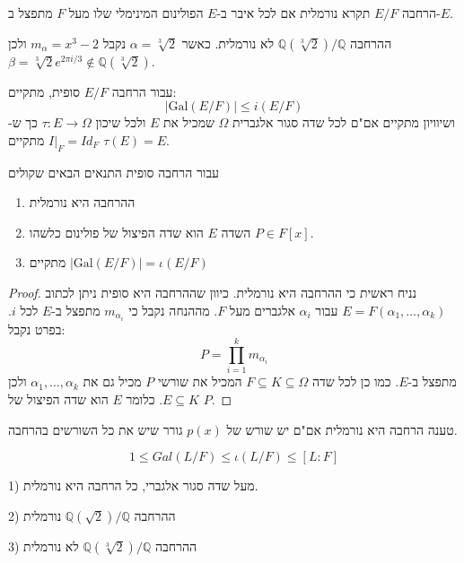 \documentclass{tstextbook}
\begin{document}
\begin{definition}
הרחבה \(E / F\) תקרא נורמלית אם לכל איבר ב-\(E\) הפולינום המינימלי שלו מעל \(F\) מתפצל ב-\(E\).

\end{definition}
\begin{example}
ההרחבה \(\mathbb{Q}\left( \sqrt[3]{ 2 }  \right) / \mathbb{Q}\)  לא נורמלית. כאשר  \(\alpha = \sqrt[3]{ 2 }\) נקבל \(m_{\alpha}=x^3 - 2\)   ולכן \(\beta = \sqrt[3]{ 2 }e^{2\pi i/3} \not\in \mathbb{Q}\left( \sqrt[3]{ 2 } \right)\).

\end{example}
\begin{proposition}
עבור הרחבה \(E / F\) סופית, מתקיים:
$$\left\lvert  \mathrm{Gal}( E / F)  \right\rvert \leq i (E / F)$$
ושיוויון מתקיים אם"ם לכל שדה סגור אלגברית \(\Omega\) שמכיל את \(E\) ולכל שיכון \(\tau:E \to \Omega\) כך ש-\(I|_{F}=Id_{F}\) מתקיים \(\tau(E)=E\).

\end{proposition}
\begin{proposition}
עבור הרחבה סופית התנאים הבאים שקולים

  \begin{enumerate}
    \item ההרחבה היא נורמלית 


    \item השדה \(E\) הוא שדה הפיצול של פולינום כלשהו \(P \in F[x]\). 


    \item מתקיים \(\left\lvert  \mathrm{Gal}(E / F)  \right\rvert=\iota(E / F)\)


  \end{enumerate}
\end{proposition}
\begin{proof}
נניח ראשית כי ההרחבה היא נורמלית. כיוון שההרחבה היא סופית ניתן לכתוב \(E=F\left( \alpha_{1},\dots,\alpha_{k} \right)\) עבור \(\alpha_{i}\) אלגברים מעל \(F\). מההנחה נקבל כי \(m_{\alpha_{i}}\) מתפצל ב-\(E\) לכל \(i\). בפרט נקבל:
$$P=\prod_{i=1}^{k}m_{\alpha_{i}}$$
מתפצל ב-\(E\). כמו כן לכל שדה \(F\subseteq K \subseteq \Omega\) המכיל את שורשי \(P\) מכיל גם את \(\alpha_{1},\dots,\alpha_{k}\) ולכן \(E\subseteq K\). כלומר \(E\) הוא שדה הפיצול של \(P\).

\end{proof}
טענה
הרחבה היא נורמלית אם"ם יש שורש של \(p(x)\) גורר שיש את כל השורשים בהרחבה.

\begin{proposition}
$$1 \leq Gal(L / F) \leq \iota( L / F) \leq [L : F]$$

\end{proposition}
\begin{example}
1) מעל שדה סגור אלגברי, כל הרחבה היא נורמלית. 

2) ההרחבה \(\mathbb{Q}\left( \sqrt{ 2 } \right) / \mathbb{Q}\) נורמלית 

3) ההרחבה \(\mathbb{Q}\left( \sqrt[3]{ 2 } \right) / \mathbb{Q}\) לא נורמלית 

\end{example}
\end{document}
